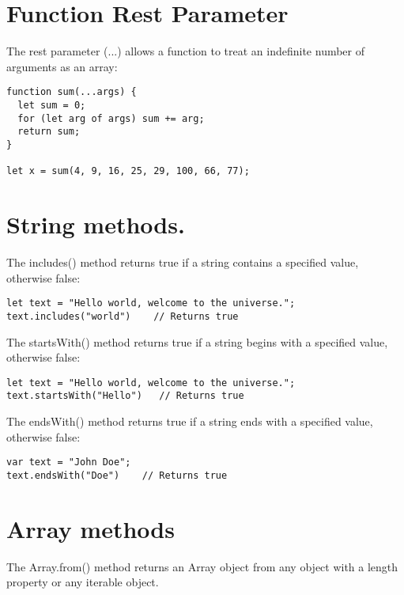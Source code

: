 \documentclass[a4paper,12pt]{article}
\begin{document}
\begin{large}
\section*{Function Rest Parameter}

The rest parameter (...) allows a function to treat an indefinite number of arguments as an array:

\begin{lstlisting}
function sum(...args) {
  let sum = 0;
  for (let arg of args) sum += arg;
  return sum;
}

let x = sum(4, 9, 16, 25, 29, 100, 66, 77);
\end{lstlisting}







\section*{String methods.}

The includes() method returns true if a string contains a specified value, otherwise false:

\begin{lstlisting}
let text = "Hello world, welcome to the universe.";
text.includes("world")    // Returns true
\end{lstlisting}

The startsWith() method returns true if a string begins with a specified value, otherwise false:

\begin{lstlisting}
let text = "Hello world, welcome to the universe.";
text.startsWith("Hello")   // Returns true
\end{lstlisting}

The endsWith() method returns true if a string ends with a specified value, otherwise false:

\begin{lstlisting}
var text = "John Doe";
text.endsWith("Doe")    // Returns true
\end{lstlisting}





\section*{Array methods}

The Array.from() method returns an Array object from any object with a length property or any iterable object.


\end{large}
\end{document}
